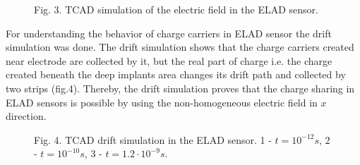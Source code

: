 \begin{figure}[h]

Fig. 3. TCAD simulation of the electric field in the ELAD sensor. 
\end{figure}

For understanding the behavior of charge carriers in ELAD sensor the drift simulation was done. The drift simulation shows that the charge carriers created near electrode are collected by it, but the real part of charge i.e. the charge created beneath the deep implants area changes its drift path and collected by two strips (fig.4).  Thereby, the drift simulation proves that the charge sharing in ELAD sensors is possible by using the non-homogeneous electric field in $x$ direction. 


\begin{figure}[h]

Fig. 4. TCAD drift simulation in the ELAD sensor. 1 - $t = 10^{-12} s$, 2 - $t = 10^{-10} s$, 3 - $t = 1.2 \cdot 10^{-9} s$. 
\end{figure}

